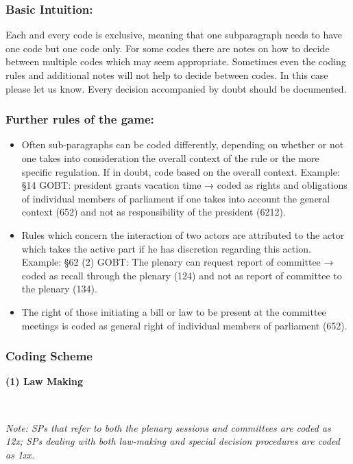 \documentclass[]{article}
\begin{document}
\subsubsection{Basic Intuition:}\label{basic-intuition}

Each and every code is exclusive, meaning that one subparagraph needs to
have one code but one code only. For some codes there are notes on how
to decide between multiple codes which may seem appropriate. Sometimes
even the coding rules and additional notes will not help to decide
between codes. In this case please let us know. Every decision
accompanied by doubt should be documented.

\subsubsection{Further rules of the
game:}\label{further-rules-of-the-game}

\begin{itemize}
\item
  Often sub-paragraphs can be coded differently, depending on whether or
  not one takes into consideration the overall context of the rule or
  the more specific regulation. If in doubt, code based on the overall
  context. Example: §14 GOBT: president grants vacation time → coded as
  rights and obligations of individual members of parliament if one
  takes into account the general context (652) and not as responsibility
  of the president (6212).
\item
  Rules which concern the interaction of two actors are attributed to
  the actor which takes the active part if he has discretion regarding
  this action. Example: §62 (2) GOBT: The plenary can request report of
  committee → coded as recall through the plenary (124) and not as
  report of committee to the plenary (134).
\item
  The right of those initiating a bill or law to be present at the
  committee meetings is coded as general right of individual members of
  parliament (652).
\end{itemize}

\subsubsection{Coding Scheme}\label{coding-scheme}

\textbf{(1) Law Making}

~

\emph{Note: SPs that refer to both the plenary sessions and committees
are coded as 12x; SPs dealing with both law-making and special decision
procedures are coded as 1xx.}
\end{document}
